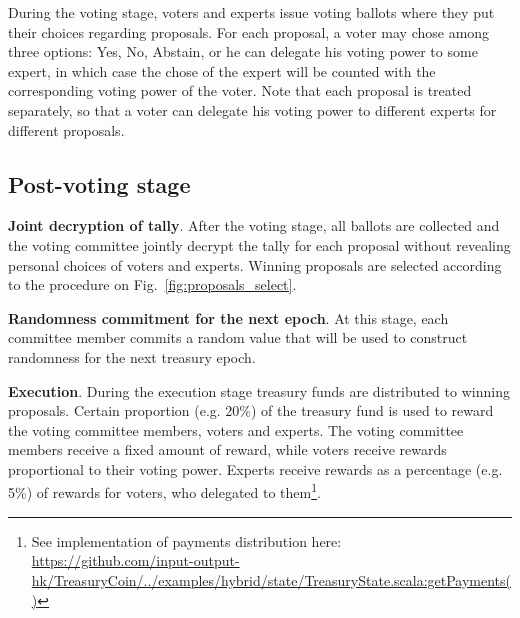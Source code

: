 During the voting stage, voters and experts issue voting ballots where they put their choices regarding proposals. For each proposal, a voter may chose among three options: Yes, No, Abstain, or he can delegate his voting power to some expert, in which case the chose of the expert will be counted with the corresponding voting power of the voter.
Note that each proposal is treated separately, so that a voter can delegate his voting power to different experts for different proposals.

\subsection{Post-voting stage}

\textbf{Joint decryption of tally}. After the voting stage, all ballots are collected and the voting committee jointly decrypt the tally for each proposal without revealing personal choices of voters and experts. Winning proposals are selected according to the procedure on Fig.~\ref{fig:proposals_select}.


\newpage
\textbf{Randomness commitment for the next epoch}. At this stage, each committee member commits a random value that will be used to construct randomness for the next treasury epoch.

\textbf{Execution}. During the execution stage treasury funds are distributed to winning proposals. Certain proportion (e.g. 20\%) of the treasury fund is used to reward the voting committee members, voters and experts. The voting committee members receive a fixed amount of reward, while voters receive rewards proportional to their voting power. Experts receive rewards as a percentage (e.g. 5\%) of rewards for voters, who delegated to them\footnote{See implementation of payments distribution here:\\ \href{https://github.com/input-output-hk/TreasuryCoin/blob/master/examples/src/main/scala/examples/hybrid/state/TreasuryState.scala\#L537}{https://github.com/input-output-hk/TreasuryCoin/../examples/hybrid/state/TreasuryState.scala:getPayments()}}.